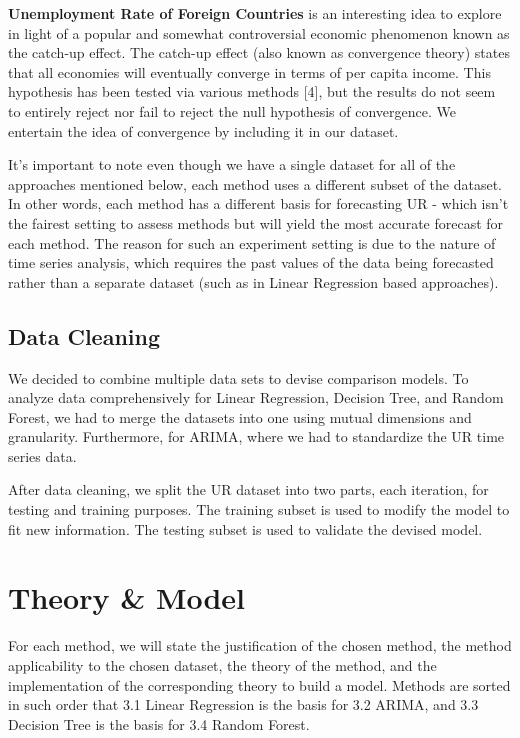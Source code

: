 \documentclass{article}
\begin{document}
	\textbf{Unemployment Rate of Foreign Countries} is an interesting idea to explore in light of a popular and somewhat controversial economic phenomenon known as the catch-up effect. The catch-up effect (also known as convergence theory) states that all economies will eventually converge in terms of per capita income. This hypothesis has been tested via various methods [4], but the results do not seem to entirely reject nor fail to reject the null hypothesis of convergence. We entertain the idea of convergence by including it in our dataset.
	
	It’s important to note even though we have a single dataset for all of the approaches mentioned below, each method uses a different subset of the dataset. In other words, each method has a different basis for forecasting UR - which isn’t the fairest setting to assess methods but will yield the most accurate forecast for each method. The reason for such an experiment setting is due to the nature of time series analysis, which requires the past values of the data being forecasted rather than a separate dataset (such as in Linear Regression based approaches).
	

	\subsection{Data Cleaning}
	We decided to combine multiple data sets to devise comparison models. To analyze data comprehensively for Linear Regression, Decision Tree, and Random Forest, we had to merge the datasets into one using mutual dimensions and granularity. Furthermore, for ARIMA, where we had to standardize the UR time series data. 

	After data cleaning, we split the UR dataset into two parts, each iteration, for testing and training purposes. The training subset is used to modify the model to fit new information. The testing subset is used to validate the devised model.
	
\section{Theory \& Model}
	For each method, we will state the justification of the chosen method, the method applicability to the chosen dataset, the theory of the method, and the implementation of the corresponding theory to build a model. Methods are sorted in such order that 3.1 Linear Regression is the basis for 3.2 ARIMA, and 3.3 Decision Tree is the basis for 3.4 Random Forest.
	
\end{document}
